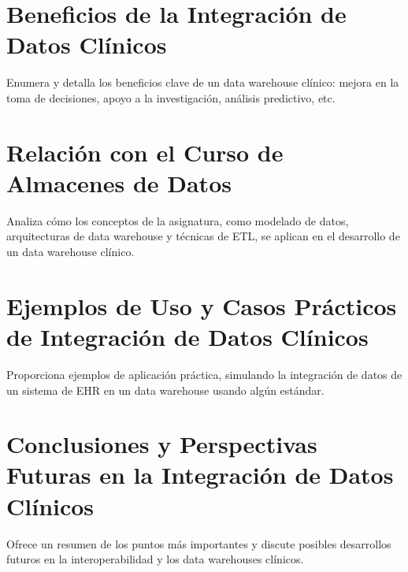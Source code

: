 \documentclass[12pt, a4paper, twoside]{article}
\begin{document}
	\section{Beneficios de la Integración de Datos Clínicos}
	Enumera y detalla los beneficios clave de un data warehouse clínico: mejora en la toma de decisiones, apoyo a la investigación, análisis predictivo, etc.
	
	\section{Relación con el Curso de Almacenes de Datos}
	Analiza cómo los conceptos de la asignatura, como modelado de datos, arquitecturas de data warehouse y técnicas de ETL, se aplican en el desarrollo de un data warehouse clínico.
	
	\section{Ejemplos de Uso y Casos Prácticos de Integración de Datos Clínicos}
	Proporciona ejemplos de aplicación práctica, simulando la integración de datos de un sistema de EHR en un data warehouse usando algún estándar.
	
	\section{Conclusiones y Perspectivas Futuras en la Integración de Datos Clínicos}
	Ofrece un resumen de los puntos más importantes y discute posibles desarrollos futuros en la interoperabilidad y los data warehouses clínicos.
	
	
	
\end{document}
